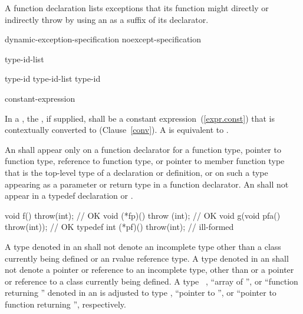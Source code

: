 \pnum
A function declaration lists exceptions
that its function might directly or indirectly throw
by using an
as a suffix of its declarator.

\begin{bnf}
\br
    dynamic-exception-specification\br
    noexcept-specification
\end{bnf}

\begin{bnf}
\br
     type-id-list\opt \terminal{)}
\end{bnf}

\begin{bnf}
\br
    type-id \opt\br
    type-id-list \terminal{,} type-id \opt
\end{bnf}

\begin{bnf}
\br
     \terminal{(} constant-expression \terminal{)}\br
\end{bnf}

%
In a , the ,
if supplied, shall be a constant expression~(\ref{expr.const}) that is contextually
converted to  (Clause~\ref{conv}). A 
 is equivalent to .

\pnum
An
shall appear only on a function declarator for a function type,
pointer to function type, reference to function type, or pointer to
member function type that is the top-level type of a declaration or
definition, or on such a type appearing as a parameter or return type
in a function declarator.
An
shall not appear in a typedef declaration or .
\enterexample
\begin{codeblock}
void f() throw(int);                    // OK
void (*fp)() throw (int);               // OK
void g(void pfa() throw(int));          // OK
typedef int (*pf)() throw(int);         // ill-formed
\end{codeblock}

\exitexample

%
A type denoted in an
shall not denote an incomplete type other than a class currently being
defined or an rvalue reference type.
A type denoted in an
shall not denote a pointer or reference to an incomplete type, other than
  or a pointer or reference to a class currently being defined.
A type \cv\ , ``array of '', or ``function returning ''
denoted in an  is adjusted to type ,
``pointer to '', or ``pointer to function returning '', respectively.

